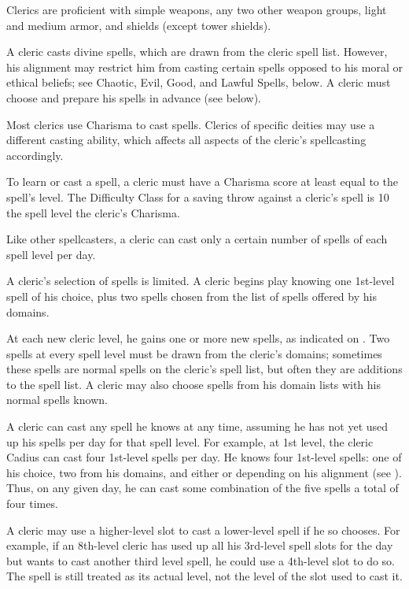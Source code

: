    Clerics are proficient with simple weapons, any two other weapon groups, light and medium armor, and shields (except tower shields).

  A cleric casts divine spells, which are drawn from the cleric spell list. However, his alignment may restrict him from casting certain spells opposed to his moral or ethical beliefs; see Chaotic, Evil, Good, and Lawful Spells, below. A cleric must choose and prepare his spells in advance (see below).

Most clerics use Charisma to cast spells. Clerics of specific deities may use a different casting ability, which affects all aspects of the cleric's spellcasting accordingly.

To learn or cast a spell, a cleric must have a Charisma score at least equal to the spell's level. The Difficulty Class for a saving throw against a cleric's spell is 10 \add the spell level \add the cleric's Charisma.

Like other spellcasters, a cleric can cast only a certain number of spells of each spell level per day.

\par A cleric's selection of spells is limited. A cleric begins play knowing one 1st-level spell of his choice, plus two spells chosen from the list of spells offered by his domains.

At each new cleric level, he gains one or more new spells, as indicated on . Two spells at every spell level must be drawn from the cleric's domains; sometimes these spells are normal spells on the cleric's spell list, but often they are additions to the spell list. A cleric may also choose spells from his domain lists with his normal spells known.

\par A cleric can cast any spell he knows at any time, assuming he
has not yet used up his spells per day for that spell level. For
example, at 1st level, the cleric Cadius can cast four 1st-level
spells per day. He knows four 1st-level spells: one of his choice, two from his domains, and either  or  depending on his alignment (see ). Thus, on any given day, he can cast some combination of the five spells a total of four times.

\par A cleric may use a higher-level slot to cast a lower-level spell if he so chooses. For example, if an 8th-level cleric has used up all his 3rd-level spell slots for the day but wants to cast another third level spell, he could use a 4th-level slot to do so. The spell is still treated as its actual level, not the level of the slot used to cast it.

